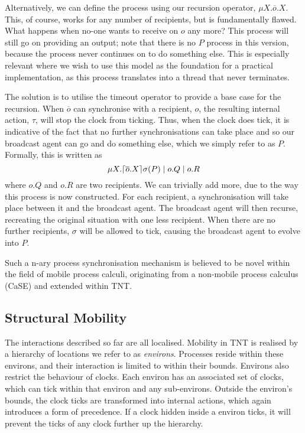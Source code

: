 \documentclass{acm_proc_article-sp}
\begin{document}
Alternatively, we can define the process using our recursion operator,
$\mu X.\overline{o}.X$.  This, of course, works for any number of
recipients, but is fundamentally flawed.  What happens when no-one wants
to receive on $o$ any more?  This process will still go on providing an
output; note that there is no $P$ process in this version, because the
process never continues on to do something else.  This is especially
relevant where we wish to use this model as the foundation for a
practical implementation, as this process translates into a thread that
never terminates.

The solution is to utilise the timeout operator to provide a base case
for the recursion.  When $\overline{o}$ can synchronise with a
recipient, $o$, the resulting internal action, $\tau$, will stop the
clock from ticking.  Thus, when the clock does tick, it is indicative of
the fact that no further synchronisations can take place and so our
broadcast agent can go and do something else, which we simply refer to
as $P$.  Formally, this is written as
\begin{displaymath} 
\mu X.\lceil{\overline{o}.X}\rceil {\sigma} ({P}) \mid o.Q \mid o.R
\end{displaymath}
where $o.Q$ and $o.R$ are two recipients.  We can trivially add more,
due to the way this process is now constructed.  For each recipient, a
synchronisation will take place between it and the broadcast agent.  The
broadcast agent will then recurse, recreating the original situation
with one less recipient.  When there are no further recipients, $\sigma$
will be allowed to tick, causing the broadcast agent to evolve into $P$.

Such a n-ary process synchronisation mechanism is believed to be novel
within the field of mobile process calculi, originating from a
non-mobile process calculus (CaSE) and extended within TNT.

\subsection{Structural Mobility}
\label{structmob}

The interactions described so far are all localised.  Mobility in TNT is
realised by a hierarchy of locations we refer to as \emph{environs}.
Processes reside within these environs, and their interaction is limited
to within their bounds.  Environs also restrict the behaviour of clocks.
Each environ has an associated set of clocks, which can tick within that
environ and any sub-environs.  Outside the environ's bounds, the clock
ticks are transformed into internal actions, which again introduces a
form of precedence.  If a clock hidden inside a environ ticks, it will
prevent the ticks of any clock further up the hierarchy.  
\end{document}
